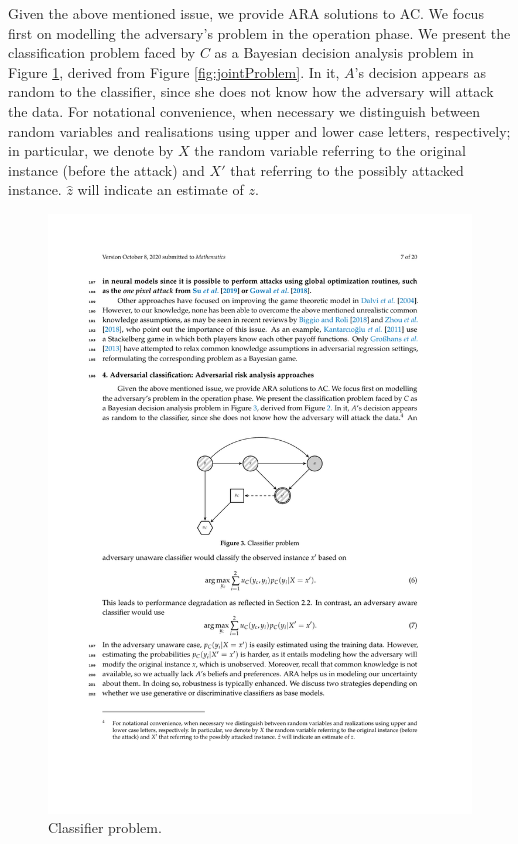 Given the above mentioned issue, we provide ARA solutions to AC.
We focus first on modelling the adversary's problem in
the operation phase. We present the classification problem faced by $C$ as a Bayesian decision analysis problem in Figure \ref{fig:classifierProblem}, derived from Figure \ref{fig:jointProblem}. In it, $A$'s decision appears as random to the classifier, since she does not know how the adversary will attack
the data. {For notational convenience, when necessary we distinguish between random variables and realisations using upper and lower case letters, respectively; in particular, we denote by $X$ the random variable referring to the original instance (before the attack) and $X'$ that referring to the possibly attacked instance. 
$\hat{z}$ will indicate an estimate of $z$.}%
\begin{figure}[H]
\centering
\includegraphics[scale=1]{figures/3.pdf}
\caption{Classifier problem.}
\label{fig:classifierProblem}
\end{figure}

